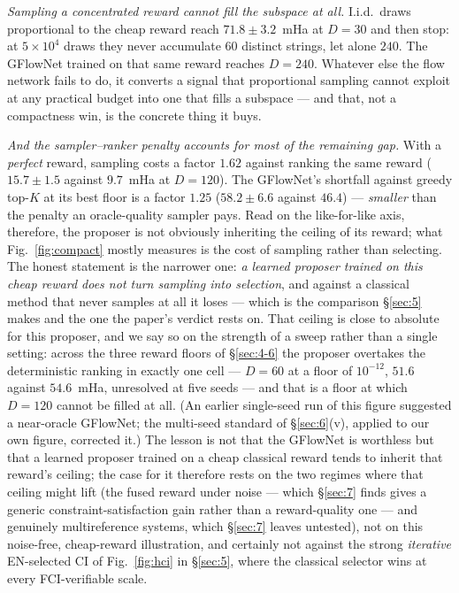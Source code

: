 \documentclass[onecolumn,a4paper]{quantumarticle}
\begin{document}
\emph{Sampling a concentrated reward cannot fill the subspace at all.} I.i.d.\ draws proportional to the cheap reward reach $71.8\pm3.2$~mHa at $D{=}30$ and then stop: at $5\times10^{4}$ draws they never accumulate $60$ distinct strings, let alone $240$. The GFlowNet trained on that same reward reaches $D{=}240$. Whatever else the flow network fails to do, it converts a signal that proportional sampling cannot exploit at any practical budget into one that fills a subspace --- and that, not a compactness win, is the concrete thing it buys.

\emph{And the sampler--ranker penalty accounts for most of the remaining gap.} With a \emph{perfect} reward, sampling costs a factor $1.62$ against ranking the same reward ($15.7\pm1.5$ against $9.7$~mHa at $D{=}120$). The GFlowNet's shortfall against greedy top-$K$ at its best floor is a factor $1.25$ ($58.2\pm6.6$ against $46.4$) --- \emph{smaller} than the penalty an oracle-quality sampler pays. Read on the like-for-like axis, therefore, the proposer is not obviously inheriting the ceiling of its reward; what Fig.~\ref{fig:compact} mostly measures is the cost of sampling rather than selecting. The honest statement is the narrower one: \emph{a learned proposer trained on this cheap reward does not turn sampling into selection}, and against a classical method that never samples at all it loses --- which is the comparison \S\ref{sec:5} makes and the one the paper's verdict rests on. That ceiling is close to absolute for this proposer, and we say so on the strength of a sweep rather than a single setting: across the three reward floors of \S\ref{sec:4-6} the proposer overtakes the deterministic ranking in exactly one cell --- $D{=}60$ at a floor of $10^{-12}$, $51.6$ against $54.6$~mHa, unresolved at five seeds --- and that is a floor at which $D{=}120$ cannot be filled at all. (An earlier single-seed run of this figure suggested a near-oracle GFlowNet; the multi-seed standard of \S\ref{sec:6}(v), applied to our own figure, corrected it.) The lesson is not that the GFlowNet is worthless but that a learned proposer trained on a cheap classical reward tends to inherit that reward's ceiling; the case for it therefore rests on the two regimes where that ceiling might lift (the fused reward under noise --- which \S\ref{sec:7} finds gives a generic constraint-satisfaction gain rather than a reward-quality one --- and genuinely multireference systems, which \S\ref{sec:7} leaves untested), not on this noise-free, cheap-reward illustration, and certainly not against the strong \emph{iterative} EN-selected CI of Fig.~\ref{fig:hci} in \S\ref{sec:5}, where the classical selector wins at every FCI-verifiable scale.
\end{document}
